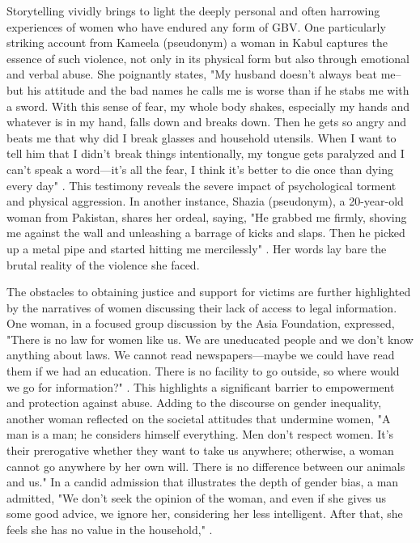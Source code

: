 \documentclass[manuscript,screen]{acmart}
\begin{document}
Storytelling vividly brings to light the deeply personal and often harrowing experiences of women who have endured any form of GBV. One particularly striking account from Kameela (pseudonym) a woman in Kabul captures the essence of such violence, not only in its physical form but also through emotional and verbal abuse. She poignantly states, "My husband doesn’t always beat me–but his attitude and the bad names he calls me is worse than if he stabs me with a sword. With this sense of fear, my whole body shakes, especially my hands and whatever is in my hand, falls down and breaks down. Then he gets so angry and beats me that why did I break glasses and household utensils. When I want to tell him that I didn’t break things intentionally, my tongue gets paralyzed and I can’t speak a word—it’s all the fear, I think it’s better to die once than dying every day" \cite{18}. This testimony reveals the severe impact of psychological torment and physical aggression. In another instance, Shazia (pseudonym), a 20-year-old woman from Pakistan, shares her ordeal, saying, "He grabbed me firmly, shoving me against the wall and unleashing a barrage of kicks and slaps. Then he picked up a metal pipe and started hitting me mercilessly" \cite{19}. Her words lay bare the brutal reality of the violence she faced.

The obstacles to obtaining justice and support for victims are further highlighted by the narratives of women discussing their lack of access to legal information. One woman, in a focused group discussion by the Asia Foundation, expressed, "There is no law for women like us. We are uneducated people and we don’t know anything about laws. We cannot read newspapers—maybe we could have read them if we had an education. There is no facility to go outside, so where would we go for information?" \cite{20}. This highlights a significant barrier to empowerment and protection against abuse. Adding to the discourse on gender inequality, another woman reflected on the societal attitudes that undermine women, "A man is a man; he considers himself everything. Men don’t respect women. It’s their prerogative whether they want to take us anywhere; otherwise, a woman cannot go anywhere by her own will. There is no difference between our animals and us." In a candid admission that illustrates the depth of gender bias, a man admitted, "We don’t seek the opinion of the woman, and even if she gives us some good advice, we ignore her, considering her less intelligent. After that, she feels she has no value in the household," \cite{20}.
\end{document}
